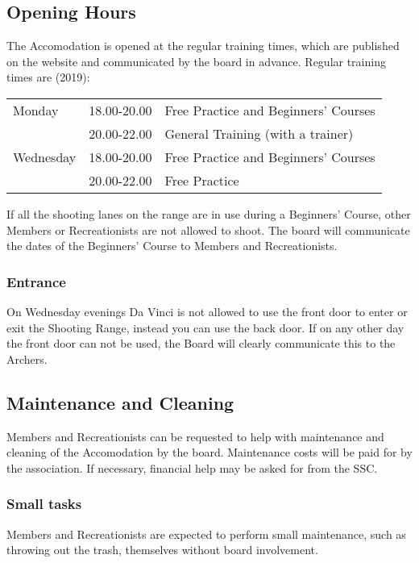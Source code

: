 \documentclass[a4paper]{article}
\begin{document}
\subsection{Opening Hours}
\label{section:opening}
The Accomodation is opened at the regular training times, which are published on the website and communicated by the board in advance. Regular training times are {\g (2019)}: \\

\begin{tabular}{lll}
Monday    & 18.00-20.00 & Free Practice  and Beginners’ Courses \\
          & 20.00-22.00 & General Training (with a trainer)     \\
Wednesday & 18.00-20.00 & Free Practice and Beginners' Courses  \\
          & 20.00-22.00 & Free Practice                        
\end{tabular}

\bigskip

If all the shooting lanes on the range are in use during a Beginners’ Course, other Members or Recreationists are not allowed to shoot. The board will communicate the dates of the Beginners’ Course to Members and Recreationists.

\subsubsection{Entrance}
On Wednesday evenings Da Vinci is not allowed to use the front door to enter or exit the Shooting Range, instead you can use the back door. If on any other day the front door can not be used, the Board will clearly communicate this to the Archers. 

\subsection{Maintenance and Cleaning}
Members and Recreationists can be requested to help with maintenance and cleaning of the Accomodation by the board. Maintenance costs will be paid for by the association. If necessary, financial help may be asked for from the SSC.

\subsubsection{Small tasks}
Members and Recreationists are expected to perform small maintenance, such as throwing out the trash, themselves without board involvement.
\end{document}
